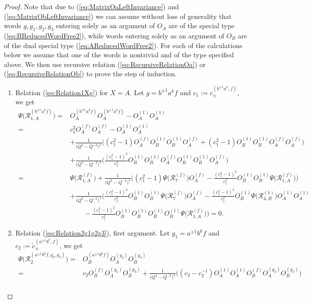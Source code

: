 \documentclass{amsart}
\newcommand{\R}{\mathcal R}
\begin{document}
\begin{proof}
Note that due to (\ref{eq:MatrixOaLeftInvariance}) and (\ref{eq:MatrixObLeftInvariance}) we can assume without loss of generality that words $g,g_1,g_2,g_3$ entering solely as an argument of $O_A$ are of the special type (\ref{eq:BReducedWordFree2}), while words entering solely as an argument of $O_B$ are of the dual special type (\ref{eq:AReducedWordFree2}). For each of the calculations below we assume that one of the words is nontrivial and of the type specified above. We then use recursive relation (\ref{eq:RecursiveRelationOa}) or (\ref{eq:RecursiveRelationOb}) to prove the step of induction.
\begin{enumerate}[\qquad1.]
\item Relation (\ref{eq:Relation1Xg}) for $X=A$. Let $g=b^{\pm1}a^kf$ and $c_1:=c_{\pm}^{(b^{\pm1}a^k,f)}$, we get
\begin{align*}
\Psi\big(\R_{1,A}^{(b^{\pm1}a^kf)}\big)=&O_A^{(b^{\pm1}a^kf)}O_A^{(b^{\pm1}a^kf)}-O_A^{(1)}O_A^{(1)}\\
=&c_1^2O_A^{(f)}O_A^{(f)}-O_A^{(1)}O_A^{(1)}\\
&+\frac1{\big(Q^2-Q^{-2}\big)^2}\Big((c_1^2-1)O_A^{(f)}O_B^{(1)}O_B^{(1)}O_A^{(f)}+(c_1^2-1)O_B^{(1)}O_B^{(1)}O_A^{(f)}O_A^{(f)}\Big)\\
&+\frac1{\big(Q^2-Q^{-2}\big)^4}\Big(\frac{(c_1^2-1)^2}{c_1^2}O_B^{(1)}O_B^{(1)}O_A^{(f)}O_B^{(1)}O_B^{(1)}O_A^{(f)}\Big)\\
=&\Psi\big(\R_{1,A}^{(f)}\big)+\frac1{\big(Q^2-Q^{-2}\big)^2}\Big((c_1^2-1)\Psi\big(\R_{7}^{(f)}\big)O_A^{(f)}-\frac{(c_1^2-1)^2}{c_1^2}O_B^{(1)}O_B^{(1)}\Psi\big(\R_{1,A}^{(f)}\big)\Big)\\
&+\frac1{\big(Q^2-Q^{-2}\big)^4}\Big(\frac{(c_1^2-1)^2}{c_1^2}O_B^{(1)}O_B^{(1)}\Psi\big(\R_{7}^{(f)}\big)O_A^{(f)}-\frac{(c_1^2-1)^2}{c_1^2}O_B^{(1)}\Psi\big(\R_{4,B}^{(1)}\big)O_A^{(1)}O_A^{(1)}\\
&\qquad-\frac{(c_1^2-1)^2}{c_1^2}O_B^{(1)}O_B^{(1)}O_B^{(1)}O_B^{(1)}\Psi\big(\R_{1,A}^{(f)}\big)\Big)=0.
\end{align*}
\item Relation (\ref{eq:Relation2g1g2g3}), first argument. Let $g_1=a^{\pm1}b^kf$ and $c_2:=\widetilde c_{\pm}^{(a^{\pm1}b^k,f)}$, we get
\begin{align*}
\Psi\big(\R_{2}^{(a^{\pm1}b^kf,g_2,g_3)}\big)=&O_B^{(a^{\pm1}b^kf)}O_A^{(g_2)}O_B^{(g_3)}\\
=&c_2O_B^{(f)}O_A^{(g_2)}O_B^{(g_3)}+\frac1{\big(Q^2-Q^{-2}\big)^2}\Big((c_2-c_2^{-1})O_A^{(1)}O_A^{(1)}O_B^{(f)}O_A^{(g_2)}O_B^{(g_3)}\Big)\\

\end{align*}
\end{enumerate}
\end{proof}
\end{document}
